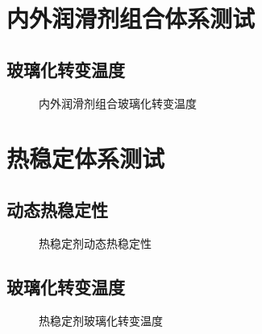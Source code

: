\section{内外润滑剂组合体系测试}

\subsection{玻璃化转变温度}
\begin{figure}[H]
    \begin{center}
        
    \end{center}
    \caption{内外润滑剂组合玻璃化转变温度}
\end{figure}

\section{热稳定体系测试}

\subsection{动态热稳定性}
\begin{figure}[H]
    \begin{center}
        
    \end{center}
    \caption{热稳定剂动态热稳定性}
\end{figure}

\subsection{玻璃化转变温度}
\begin{figure}[H]
    \begin{center}
        
    \end{center}
    \caption{热稳定剂玻璃化转变温度}
\end{figure}
